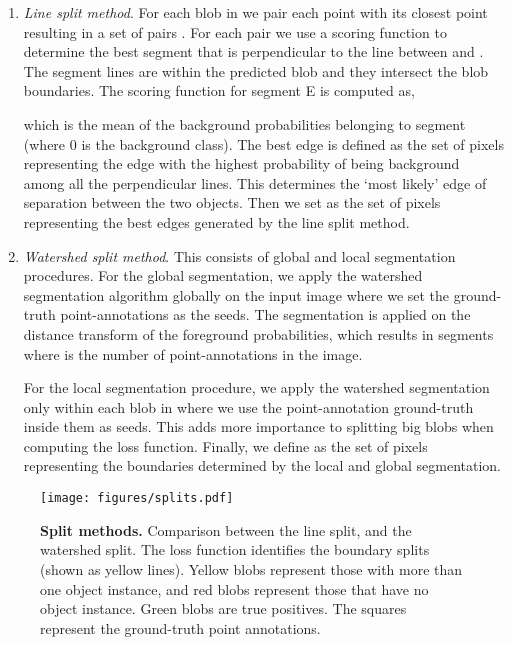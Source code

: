 \documentclass[runningheads]{llncs}
\begin{document}
\begin{enumerate}
\item {\it Line split method}. For each blob  in  we pair each point with its closest point resulting in a set of pairs . For each pair  we use a scoring function to determine the best segment  that is perpendicular to the line between  and . The segment lines are within the predicted blob and they intersect the blob boundaries. The scoring function  for segment E is computed as,

which is the mean of the background probabilities belonging to segment  (where 0 is the background class). The best edge  is defined as the set of pixels representing the edge with the highest probability of being background among all the perpendicular lines. This determines the `most likely' edge of separation between the two objects. Then we set  as the set of pixels representing the best edges generated by the line split method.



\item {\it Watershed split method}. This consists of global and local segmentation procedures. For the global segmentation, we apply the watershed segmentation algorithm \cite{beucher1992morphological} globally on the input image where we set the ground-truth point-annotations as the seeds.  The segmentation is applied on the distance transform of the foreground probabilities, which results in  segments where  is the number of point-annotations in the image.

For the local segmentation procedure, we apply the watershed segmentation only within each blob  in  where we use  the point-annotation ground-truth inside them as seeds. This adds more importance to splitting big blobs when computing the loss function. Finally, we define  as the set of pixels representing the boundaries determined by the local and global segmentation.
\end{enumerate}


\begin{figure}[!t]
\centering
\texttt{[image: figures/splits.pdf]}
\caption{{\bf Split methods.} Comparison between the line split, and the watershed split. The loss function identifies the boundary splits (shown as yellow lines). Yellow blobs represent those with more than one object instance, and red blobs represent those that have no object instance. Green blobs are true positives. The squares represent the ground-truth point annotations.}
\label{fig:splits}
\end{figure}
\end{document}
